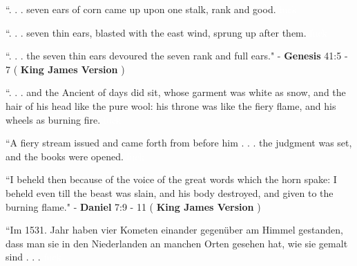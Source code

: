 \documentclass[11pt]{article}
\begin{document}
\vspace*{0.1\baselineskip}

\begingroup
\begin{center}
``. . . seven ears of corn came up upon one stalk, rank and good.
\rightskip\leftskip
\phantom{text} \hfill \textcolor{white}{fuck}
\end{center}
\endgroup

\begingroup
\begin{center}
``. . . seven thin ears, blasted with the east wind, sprung up after them.
\rightskip\leftskip
\phantom{text} \hfill \textcolor{white}{fuck}
\end{center}
\endgroup

\begingroup
\begin{center}
``. . . the seven thin ears devoured the seven rank and full ears."
\rightskip\leftskip
\phantom{text} \hfill - \textbf{Genesis} 41:5 - 7 ( \textbf{King James Version} )
\end{center}
\endgroup

\vspace*{0.1\baselineskip}

\begingroup
\begin{center}
``. . . and the Ancient of days did sit, whose garment was white as snow, and the hair of his head like the pure wool: his throne was like the fiery flame, and his wheels as burning fire.
\rightskip\leftskip
\phantom{text} \hfill \textcolor{white}{fuck}
\end{center}
\endgroup

\begingroup
\begin{center}
``A fiery stream issued and came forth from before him . . . the judgment was set, and the books were opened.
\rightskip\leftskip
\phantom{text} \hfill \textcolor{white}{fuck}
\end{center}
\endgroup

\begingroup
\begin{center}
``I beheld then because of the voice of the great words which the horn spake: I beheld even till the beast was slain, and his body destroyed, and given to the burning flame."
\rightskip\leftskip
\phantom{text} \hfill - \textbf{Daniel} 7:9 - 11 ( \textbf{King James Version} )
\end{center}
\endgroup

\vspace*{0.1\baselineskip}

\begingroup
\begin{center}
``Im 1531. Jahr haben vier Kometen einander gegenüber am Himmel gestanden, dass man sie in den Niederlanden an manchen Orten gesehen hat, wie sie gemalt sind . . . 
\rightskip\leftskip
\phantom{text} \hfill \textcolor{white}{fuck}
\end{center}
\endgroup
\end{document}
